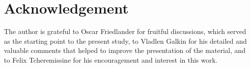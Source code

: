\documentclass[10pt]{article}
\begin{document}
\section*{Acknowledgement}

The author is grateful to Oscar Friedlander for fruitful discussions, which served as the starting point to the present study,
to Vladlen Galkin for his detailed and valuable comments that helped to improve the presentation of the material,
and to Felix Tcheremissine for his encouragement and interest in this work.



\end{document}
